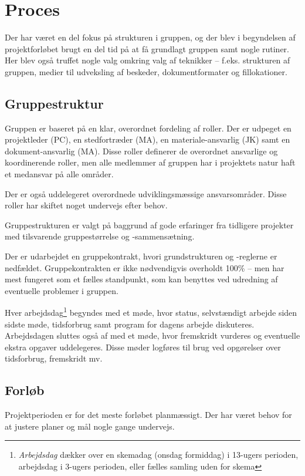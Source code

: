 \chapter{Proces}\label{cha:process}
Der har været en del fokus på strukturen i gruppen, og der blev i begyndelsen af projektforløbet brugt en del tid på at få grundlagt gruppen samt nogle rutiner. Her blev også truffet nogle valg omkring valg af teknikker -- f.eks. strukturen af gruppen, medier til udveksling af beskeder, dokumentformater og fillokationer.

\section{Gruppestruktur}
Gruppen er baseret på en klar, overordnet fordeling af roller. Der er udpeget en projektleder (PC), en stedfortræder (MA), en materiale-ansvarlig (JK) samt en dokument-ansvarlig (MA). Disse roller definerer de overordnet ansvarlige og koordinerende roller, men alle medlemmer af gruppen har i projektets natur haft et medansvar på alle områder.

Der er også uddelegeret overordnede udviklingsmæssige ansvarsområder. Disse roller har skiftet noget undervejs efter behov.

Gruppestrukturen er valgt på baggrund af gode erfaringer fra tidligere projekter med tilsvarende gruppestørrelse og -sammensætning.

Der er udarbejdet en gruppekontrakt, hvori grundstrukturen og -reglerne er nedfældet. Gruppekontrakten er ikke nødvendigvis overholdt 100\% -- men har mest fungeret som et fælles standpunkt, som kan benyttes ved udredning af eventuelle problemer i gruppen.

Hver arbejdsdag\footnote{\textit{Arbejdsdag} dækker over en skemadag (onsdag formiddag) i 13-ugers perioden, arbejdsdag i 3-ugers perioden, eller fælles samling uden for skema} begyndes med et møde, hvor status, selvstændigt arbejde siden sidste møde, tidsforbrug samt program for dagens arbejde diskuteres. Arbejdsdagen sluttes også af med et møde, hvor fremskridt vurderes og eventuelle ekstra opgaver uddelegeres. Disse møder logføres til brug ved opgørelser over tidsforbrug, fremskridt mv.

\section{Forløb}
Projektperioden er for det meste forløbet planmæssigt. Der har været behov for at justere planer og mål nogle gange undervejs.

